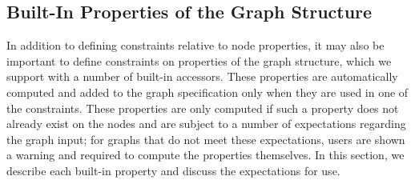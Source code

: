 \subsection{Built-In Properties of the Graph Structure}
\label{sec:built-in-properties}

In addition to defining constraints relative to node properties, it may
also be important to define constraints on properties
of the graph structure, which we support with a number of built-in accessors.
These properties are automatically computed and added to the graph 
specification only when they are used in one of the \projectname constraints. 
These properties are only computed if such a property does not
already exist on the nodes and are subject to a number of expectations
regarding the graph input; for graphs that do not meet these expectations,
users are shown a warning and required to compute the properties
themselves. In this section, we describe each built-in property and discuss 
the expectations for use.


